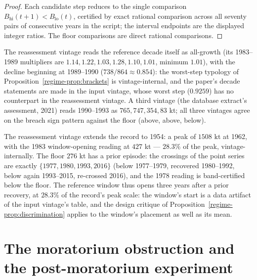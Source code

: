 \begin{proof}
Each candidate step reduces to the single comparison
\(B_{\mathrm{hi}}(t+1) < B_{\mathrm{lo}}(t)\), certified by exact
rational comparison across all seventy pairs of consecutive years in
the script; the interval endpoints are the displayed integer ratios.
The floor comparisons are direct rational comparisons.
\end{proof}

\begin{remark}
\label{regime-rem:vintagetypology}
The reassessment vintage reads the reference decade itself as
all-growth (its 1983--1989 multipliers are \(1.14, 1.22, 1.03, 1.28,
1.10, 1.01\), minimum \(1.01\)), with the decline beginning at
1989--1990 (\(738/864 \approx 0.854\)): the worst-step typology of
Proposition~\ref{regime-prop:brackets} is vintage-internal, and the
paper's decade statements are made in the input vintage, whose
worst step (\(0.9259\)) has no counterpart in the reassessment
vintage. A third vintage (the database extract's assessment, 2021)
reads 1990--1993 as \(765, 747, 354, 83\) kt; all three vintages
agree on the breach sign pattern against the floor (above, above,
below).
\end{remark}

\begin{remark}
\label{regime-rem:backward}
The reassessment vintage extends the record to 1954: a peak of
\(1508\) kt at 1962, with the 1983 window-opening reading at
\(427\) kt --- \(28.3\%\) of the peak, vintage-internally. The floor
\(276\) kt has a prior episode: the crossings of the point series are
exactly \(\{1977, 1980, 1993, 2016\}\) (below 1977--1979, recovered
1980--1992, below again 1993--2015, re-crossed 2016), and the 1978
reading is band-certified below the floor. The reference window thus
opens three years after a prior recovery, at \(28.3\%\) of the
record's peak scale: the window's start is a data artifact of the
input vintage's table, and the design critique of
Proposition~\ref{regime-prop:discrimination} applies to the window's
placement as well as its mean.
\end{remark}

\section{The moratorium obstruction and the post-moratorium
experiment}\label{regime-moratorium}

